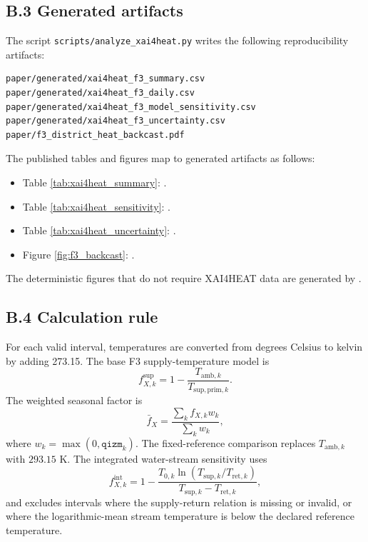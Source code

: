 \documentclass[11pt]{article}
\begin{document}
\subsection*{B.3 Generated artifacts}

The script \texttt{scripts/analyze\_xai4heat.py} writes the following reproducibility artifacts:
\begin{verbatim}
paper/generated/xai4heat_f3_summary.csv
paper/generated/xai4heat_f3_daily.csv
paper/generated/xai4heat_f3_model_sensitivity.csv
paper/generated/xai4heat_f3_uncertainty.csv
paper/f3_district_heat_backcast.pdf
\end{verbatim}

The published tables and figures map to generated artifacts as follows:
\begin{itemize}
\item Table \ref{tab:xai4heat_summary}: .
\item Table \ref{tab:xai4heat_sensitivity}: .
\item Table \ref{tab:xai4heat_uncertainty}: .
\item Figure \ref{fig:f3_backcast}: .
\end{itemize}
The deterministic figures that do not require XAI4HEAT data are generated by
.

\subsection*{B.4 Calculation rule}

For each valid interval, temperatures are converted from degrees Celsius to kelvin by adding 273.15. The base F3 supply-temperature model is
\begin{equation}
f_{X,k}^{\mathrm{sup}}=1-\frac{T_{\mathrm{amb},k}}{T_{\mathrm{sup,prim},k}}.
\end{equation}
The weighted seasonal factor is
\begin{equation}
\bar{f}_X=\frac{\sum_k f_{X,k}w_k}{\sum_k w_k},
\end{equation}
where $w_k=\max(0,\texttt{qizm}_k)$. The fixed-reference comparison replaces $T_{\mathrm{amb},k}$ with $293.15$ K. The integrated water-stream sensitivity uses
\begin{equation}
f_{X,k}^{\mathrm{int}}=1-\frac{T_{0,k}\ln(T_{\mathrm{sup},k}/T_{\mathrm{ret},k})}{T_{\mathrm{sup},k}-T_{\mathrm{ret},k}},
\end{equation}
and excludes intervals where the supply-return relation is missing or invalid, or where the logarithmic-mean stream temperature is below the declared reference temperature.
\end{document}
